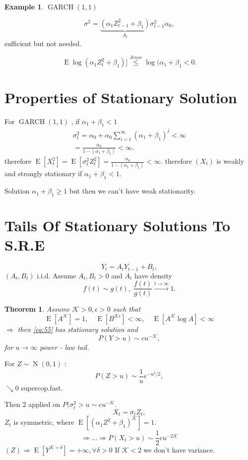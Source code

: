 \documentclass[12pt,a4paper, notitlepage]{book}
\theoremstyle{definition} %
\newtheorem{example}{Example}[chapter]
\theoremstyle{plain} %
\newtheorem{theorem}{Theorem}
\DeclareMathOperator{\E}{E}
\DeclareMathOperator{\No}{N}
\DeclareMathOperator{\Garch}{GARCH}
\begin{document}
\begin{example} $ \Garch(1,1) $

\[ \sigma^2 = \underbrace{ (\alpha_1 Z_{t-1}^2 + \beta_1)}_{A_t}  \sigma_{t-1}^2 \alpha_0 , \]
sufficient but not needed. 

\[ \E \log(\alpha_1 Z_t^2 + \beta_1)]  \overset{Jense}{\leq} \log(\alpha_1 + \beta_1 < 0 . \]


\section{ Properties of Stationary Solution}

For $ \Garch(1,1) $ , if $ \alpha _1 + \beta _1 <1 $
\begin{align*}
 \sigma _t ^2 = \alpha_0 + \alpha_0 \sum_{i=1}^{\infty}(\alpha_1 + \beta_1)^j < \infty \\
= \frac{\alpha_0}{1 - (\alpha_1 + \beta_1)} < \infty . 
\end{align*}
therefore $ \E[X_t^2 ] = \E[\sigma_t^2 Z_t^2] = \frac{\alpha_0}{1- (\alpha_1 + \beta_1)} < \infty . $
therefore $ (X_t) $ is weakly and strongly stationary if $ \alpha_1 + \beta_1 < 1 $.

Solution $ \alpha_1 + \beta_1 \geq 1 $ but then we can't have weak stationarity.

\section{Tails Of Stationary Solutions To S.R.E}

\[ Y_t = A_t Y_{t-1} + B_t, \]
$(A_t, B_t) $ i.i.d. Assume $ A_t, B_t > 0 $ and $ A_t $ have density 
\[ f(t) \sim g(t) , \; \frac{f(t)}{g(t)} \overset{t \to \infty}{\rightarrow } 1 . \]
\end{example}


\begin{theorem}
Assume $ \mathcal{K} > 0 , \epsilon > 0 $ such that 
\[ \E[A^{\mathcal{K}}] =1, \quad \E[ B^{\mathcal{K} \epsilon} ] < \infty, \quad \E[ A^{\mathcal{K}} \log A] < \infty \]
$ \Rightarrow $  then \ref{eq:55}  has stationary solution and 
\[ P(Y> u) \sim c u^{- \mathcal{K}} , \]
for $ u \to \infty $ power - law tail.
\end{theorem}

For $ Z \sim \No(0,1) $ :
\[ P(Z > u) \sim \frac{1}{u} e^{-u^2 /2} , \]
$ \searrow 0 $ supercop.fast.

Then $ 2 $ applied on $ P( \sigma_t^2  > u \sim c u ^{-\mathcal{K}} $.
\[ X_t = \sigma_t Z_t, \]
$ Z_t  $ is symmetric, where $ \E[ (\alpha_1 Z^2 + \beta_1)^{\mathcal{K}} ] =1 $.
\[ \Rightarrow \ldots \Rightarrow P(X_t >u) \sim \frac{1}{2} c u ^{-2 \mathcal{K}} \]
$ (Z) \Rightarrow \E[ Y^{\mathcal{K} + \delta} ] =  + \infty , \forall \delta > 0 $
If $ \mathcal{K}  < 2 $ we don't have variance.
\end{document}

